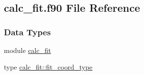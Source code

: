 \hypertarget{calc__fit_8f90}{\subsection{calc\-\_\-fit.\-f90 File Reference}
\label{calc__fit_8f90}
}
\subsubsection*{Data Types}
\begin{DoxyCompactItemize}
\item 
module \hyperlink{classcalc__fit}{calc\-\_\-fit}
\item 
type \hyperlink{structcalc__fit_1_1fit__coord__type}{calc\-\_\-fit\-::fit\-\_\-coord\-\_\-type}
\end{DoxyCompactItemize}
